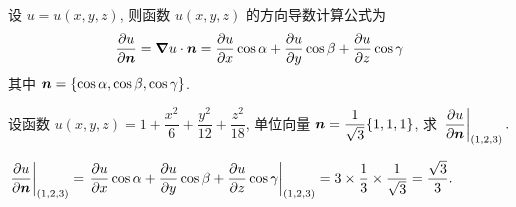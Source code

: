 \begin{theorem}
    设 $u=u(x,y,z)$, 则函数 $u(x,y,z)$ 的方向导数计算公式为
    $$\pdv{u}{\vb*{n}}=\grad u\cdot\vb*{n}=\pdv{u}{x}\cos\alpha+\pdv{u}{y}\cos\beta+\pdv{u}{z}\cos\gamma$$
    其中 $\vb*{n}=\qty{\cos\alpha,\cos\beta,\cos\gamma}$.
\end{theorem}

\begin{example}[2005 数一]
    设函数 $u(x,y,z)=1+\dfrac{x^2}{6}+\dfrac{y^2}{12}+\dfrac{z^2}{18}$, 单位向量 $\vb*{n}=\dfrac{1}{\sqrt{3}}\qty{1,1,1}$, 求
    $\displaystyle \eval{\pdv{u}{\vb*{n}}}_{(1,2,3)}.$
\end{example}
\begin{solution}
    $\displaystyle\eval{\pdv{u}{\vb*{n}}}_{(1,2,3)}=\eval{\pdv{u}{x}\cos\alpha+\pdv{u}{y}\cos\beta+\pdv{u}{z}\cos\gamma}_{(1,2,3)}=3\times\dfrac{1}{3}\times\dfrac{1}{\sqrt{3}}=\dfrac{\sqrt{3}}{3}.$
\end{solution}

